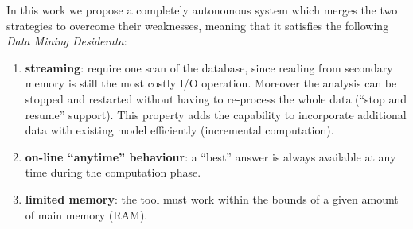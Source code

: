 In this work we propose a completely autonomous system which merges the two strategies to overcome their weaknesses, meaning that it satisfies the following \emph{Data Mining Desiderata}:
\begin{enumerate}
    \item \textbf{streaming}: require one scan of the database, since reading from secondary memory is still the most costly I/O operation.
    Moreover the analysis can be stopped and restarted without having to re-process the whole data (``stop and resume'' support).
    This property adds the capability to incorporate additional data with existing model efficiently (incremental computation).
    \item \textbf{on-line ``anytime'' behaviour}: a ``best'' answer is always available at any time during the computation phase.
    \item \textbf{limited memory}: the tool must work within the bounds of a given amount of main memory (RAM).
\end{enumerate}
